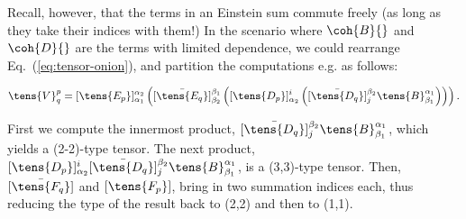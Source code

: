 Recall, however, that the terms in an Einstein sum commute freely (as long as they take their indices with them!) In the scenario where $\coh{B}{}$ and $\coh{D}{}$ are the terms with limited dependence, we could rearrange Eq.~(\ref{eq:tensor-onion}), and partition the computations e.g. as follows:

\[
\tens{V}_{q}^{p} = [\tens{E_p}]^{\alpha_2}_{\alpha_1}
\left(
  [\bar\tens{E_q}]^{\beta_1}_{\beta_2}  
\left(
    [\tens{D_p}]^{i}_{\alpha_2} 
\left(
    [\bar\tens{D_q}]^{\beta_2}_{j}
    \tens{B}^{\alpha_1}_{\beta_1}
\right)\right)\right).
\]

First we compute the innermost product, $[\bar\tens{D_q}]^{\beta_2}_{j}\tens{B}^{\alpha_1}_{\beta_1}$, which yields a (2-2)-type tensor. The next product, $[\tens{D_p}]^{i}_{\alpha_2}[\bar\tens{D_q}]^{\beta_2}_{j}\tens{B}^{\alpha_1}_{\beta_1}$, is a (3,3)-type tensor. Then, $[\bar\tens{F_q}]$ and $[\tens{F_p}]$, bring in two summation indices each, thus reducing the type of the result back to (2,2) and then to (1,1). 



 


 

